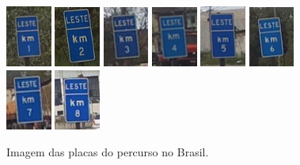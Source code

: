 \documentclass{article}
\begin{document}
\begin{figure}[!h]
    \centering
    \includegraphics[width=1.5cm]{./img/BPlaca1.png}\quad
    \includegraphics[width=1.5cm]{./img/BPlaca2.png}\quad
    \includegraphics[width=1.5cm]{./img/BPlaca3.png}\quad
    \includegraphics[width=1.5cm]{./img/BPlaca4.png}\quad
    \includegraphics[width=1.5cm]{./img/BPlaca5.png}\quad
    \includegraphics[width=1.5cm]{./img/BPlaca6.png}\quad
    \includegraphics[width=1.5cm]{./img/BPlaca7.png}\quad
    \includegraphics[width=1.5cm]{./img/BPlaca8.png}
    \caption{Imagem das placas do percurso no Brasil.}
\end{figure}
\end{document}
